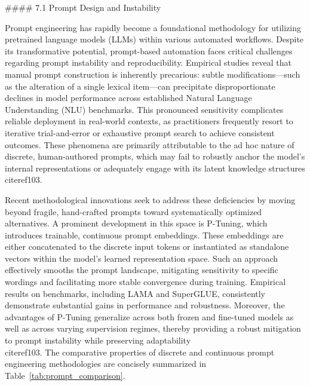 \documentclass[11pt]{article}
\begin{document}
#### 7.1 Prompt Design and Instability

Prompt engineering has rapidly become a foundational methodology for utilizing pretrained language models (LLMs) within various automated workflows. Despite its transformative potential, prompt-based automation faces critical challenges regarding prompt instability and reproducibility. Empirical studies reveal that manual prompt construction is inherently precarious: subtle modifications—such as the alteration of a single lexical item—can precipitate disproportionate declines in model performance across established Natural Language Understanding (NLU) benchmarks. This pronounced sensitivity complicates reliable deployment in real-world contexts, as practitioners frequently resort to iterative trial-and-error or exhaustive prompt search to achieve consistent outcomes. These phenomena are primarily attributable to the ad hoc nature of discrete, human-authored prompts, which may fail to robustly anchor the model’s internal representations or adequately engage with its latent knowledge structures \\cite{ref103}.

Recent methodological innovations seek to address these deficiencies by moving beyond fragile, hand-crafted prompts toward systematically optimized alternatives. A prominent development in this space is P-Tuning, which introduces trainable, continuous prompt embeddings. These embeddings are either concatenated to the discrete input tokens or instantiated as standalone vectors within the model’s learned representation space. Such an approach effectively smooths the prompt landscape, mitigating sensitivity to specific wordings and facilitating more stable convergence during training. Empirical results on benchmarks, including LAMA and SuperGLUE, consistently demonstrate substantial gains in performance and robustness. Moreover, the advantages of P-Tuning generalize across both frozen and fine-tuned models as well as across varying supervision regimes, thereby providing a robust mitigation to prompt instability while preserving adaptability \\cite{ref103}. The comparative properties of discrete and continuous prompt engineering methodologies are concisely summarized in Table~\ref{tab:prompt_comparison}.
\end{document}
